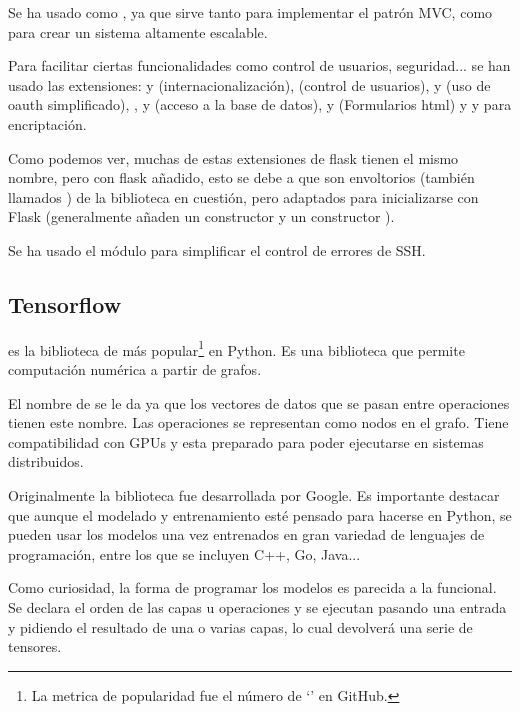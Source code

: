 Se ha usado  como , ya que sirve tanto para implementar el patrón MVC, como para crear un sistema altamente escalable. 

Para facilitar ciertas funcionalidades como control de usuarios, seguridad... se han usado las extensiones:  y  (internacionalización),  (control de usuarios),  y  (uso de oauth simplificado), ,  y  (acceso a la base de datos),  y  (Formularios html) y  y  para encriptación.

Como podemos ver, muchas de estas extensiones de flask tienen el mismo nombre, pero con flask añadido, esto se debe a que son envoltorios (también llamados ) de la biblioteca en cuestión, pero adaptados para inicializarse con Flask (generalmente añaden un constructor y un constructor ).

Se ha usado el módulo  para simplificar el control de errores de SSH.

\subsection{Tensorflow}
 es la biblioteca de  más popular\footnote{La metrica de popularidad fue el número de `' en GitHub.} en Python. Es una biblioteca  que permite computación numérica a partir de grafos.

El nombre de  se le da ya que los vectores de datos que se pasan entre operaciones tienen este nombre. Las operaciones se representan como nodos en el grafo. Tiene compatibilidad con GPUs y esta preparado para poder ejecutarse en sistemas distribuidos. 

Originalmente la biblioteca fue desarrollada por Google. Es importante destacar que aunque el modelado y entrenamiento esté pensado para hacerse en Python, se pueden usar los modelos una vez entrenados en gran variedad de lenguajes de programación, entre los que se incluyen C++, Go, Java... 

Como curiosidad, la forma de programar los modelos es parecida a la funcional. Se declara el orden de las capas u operaciones y se ejecutan pasando una entrada y pidiendo el resultado de una o varias capas, lo cual devolverá una serie de tensores. 




 

